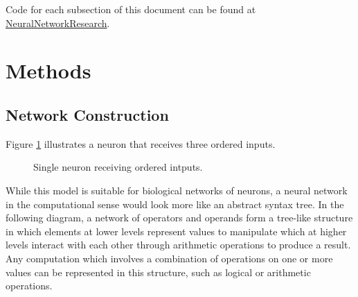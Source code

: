 \documentclass{article}
\begin{document}
     Code for each subsection of this document can be found at \href{https://github.com/DariusBxsci/NeuralNetworkResearch/tree/master/NeuralNets}{NeuralNetworkResearch}. 


\section{Methods}

\subsection{Network Construction}

 Figure \ref{fig:sig-neuron} illustrates a neuron that receives three ordered inputs. 
 
 \begin{figure}[h]
 \centering
 \caption{Single neuron receiving ordered intputs. \label{fig:sig-neuron}}
\end{figure}

While this model is suitable for biological networks of neurons, a neural network in the computational sense would look more like an abstract syntax tree. In the following diagram, a network of operators and operands form a tree-like structure in which elements at lower levels represent values to manipulate which at higher levels interact with each other through arithmetic operations to produce a result. Any computation which involves a combination of operations on one or more values can be represented in this structure, such as logical or arithmetic operations.
\end{document}
